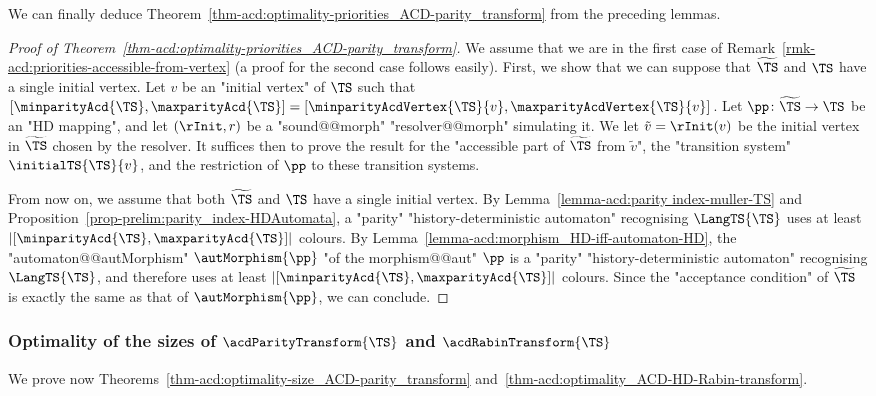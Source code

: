 \documentclass{theoretics}
\begin{document}
We can finally deduce Theorem~\ref{thm-acd:optimality-priorities_ACD-parity_transform} from the preceding lemmas.
\begin{proof}[Proof of Theorem~\ref{thm-acd:optimality-priorities_ACD-parity_transform}]
	We assume that we are in the first case of Remark~\ref{rmk-acd:priorities-accessible-from-vertex} (a proof for the second case follows easily). First, we show that we can suppose that $\widetilde{\TS}$ and $\TS$ have a single initial vertex. Let $v$ be an "initial vertex" of $\TS$ such that $[\minparityAcd{\TS}, \maxparityAcd{\TS}] = [\minparityAcdVertex{\TS}{v}, \maxparityAcdVertex{\TS}{v}]$. 
	Let $\pp\colon \widetilde{\TS} \to \TS$ be an "HD mapping", and let $(\rInit, r)$ be a "sound@@morph" "resolver@@morph" simulating it. We let $\tilde{v} = \rInit(v)$ be the initial vertex in $\widetilde{\TS}$ chosen by the resolver. It suffices then to prove the result for the "accessible part of $\widetilde{\TS}$ from $\tilde{v}$", the "transition system" $\initialTS{\TS}{v}$,  and the restriction of $\pp$ to these transition systems. 
	
	From now on, we assume that both $\widetilde{\TS}$ and $\TS$ have a single initial vertex.
	By Lemma~\ref{lemma-acd:parity index-muller-TS} and Proposition~\ref{prop-prelim:parity_index-HDAutomata}, a "parity" "history-deterministic automaton" recognising $\LangTS{\TS}$ uses at least $|[\minparityAcd{\TS}, \maxparityAcd{\TS}]|$ colours. By Lemma~\ref{lemma-acd:morphism_HD-iff-automaton-HD}, the "automaton@@autMorphism" $\autMorphism{\pp}$ "of the morphism@@aut" $\pp$ is a "parity" "history-deterministic automaton" recognising $\LangTS{\TS}$, and therefore uses at least $|[\minparityAcd{\TS}, \maxparityAcd{\TS}]|$ colours. Since the "acceptance condition" of $\widetilde{\TS}$ is exactly the same as that of $\autMorphism{\pp}$, we can conclude.
\end{proof}


\subsubsection{Optimality of the sizes \texorpdfstring{of $\acdParityTransform{\TS}$ and $\acdRabinTransform{\TS}$}{}}
We prove now Theorems~\ref{thm-acd:optimality-size_ACD-parity_transform} and~\ref{thm-acd:optimality_ACD-HD-Rabin-transform}. 
\end{document}
